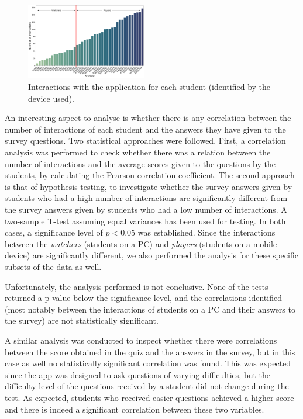 \documentclass[pdflatex,sn-basic,iicol]{sn-jnl}%
\begin{document}
\begin{figure}[htbp]
    \centering
    \includegraphics[width=0.47\textwidth]{imgs/num_interactions_2.png}
    \caption{Interactions with the application for each student (identified by the device used).}
    \label{fig:num_interactions}
\end{figure}

An interesting aspect to analyse is whether there is any correlation between the number of interactions of each student and the answers they have given to the survey questions. Two statistical approaches were followed. First,  a correlation analysis was performed to check whether there was a relation between the number of interactions and the average scores given to the questions by the students, by calculating the Pearson correlation coefficient. The second approach is that of hypothesis testing, to investigate whether the survey answers given by students who had a high number of interactions are significantly different from the survey answers given by students who had a low number of interactions. A two-sample T-test assuming equal variances has been used for testing. In both cases, a significance level of $p < 0.05$ was established.
Since the interactions between the \textit{watchers} (students on a PC) and \textit{players} (students on a mobile device) are significantly different, we also performed the analysis for these specific subsets of the data as well.

Unfortunately, the analysis performed is not conclusive. None of the tests returned a p-value below the significance level, and the correlations identified (most notably between the interactions of students on a PC and their answers to the survey) are not statistically significant. 

A similar analysis was conducted to inspect whether there were correlations between the score obtained in the quiz and the answers in the survey, but in this case as well no statistically significant correlation was found. This was  expected since the app was designed to ask questions of varying difficulties, but the difficulty level of the questions received by a student did not change during the test. As expected, students who received easier questions achieved a higher score and there is indeed a significant correlation between these two variables.
\end{document}
